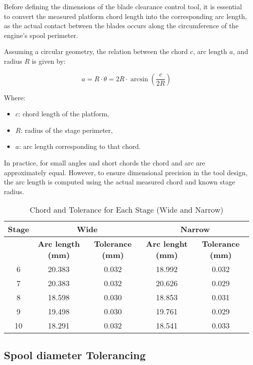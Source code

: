 Before defining the dimensions of the blade clearance control tool, it is essential to convert the measured platform chord length into the corresponding arc length, as the actual contact between the blades occurs along the circumference of the engine's spool perimeter.

Assuming a circular geometry, the relation between the chord \(c\), arc length \(a\), and radius \(R\) is given by:

\[
a = R \cdot \theta = 2R \cdot \arcsin\left( \frac{c}{2R} \right)
\]

Where:
\begin{itemize}
    \item \(c\): chord length of the platform,
    \item \(R\): radius of the stage perimeter,
    \item \(a\): arc length corresponding to that chord.
\end{itemize}

In practice, for small angles and short chords the chord and arc are approximately equal. 
However, to ensure dimensional precision in the tool design, the arc length is computed using the actual measured chord and known stage radius.

\begin{table}[H]
    \centering
    \caption{Chord and Tolerance for Each Stage (Wide and Narrow)}
    \label{tab:chord_tolerance_per_stage}
    \begin{tabular}{ccccc}
        \hline
        \textbf{Stage} & \multicolumn{2}{c}{\textbf{Wide}} & \multicolumn{2}{c}{\textbf{Narrow}} \\
        \hline
         & \textbf{Arc length (mm)} & \textbf{Tolerance (mm)} & \textbf{Arc lenght (mm)} & \textbf{Tolerance (mm)} \\
        \hline
        6 & 20.383 & 0.032 & 18.992 & 0.032 \\
        7 & 20.383 & 0.032 & 20.626 & 0.029 \\
        8 & 18.598 & 0.030 & 18.853 & 0.031 \\
        9 & 19.498 & 0.030 & 19.761 & 0.029 \\
        10 & 18.291 & 0.032 & 18.541 & 0.033 \\
        \hline
    \end{tabular}
\end{table}


\subsection{Spool diameter Tolerancing}

